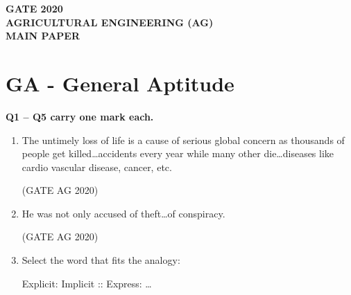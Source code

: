 \documentclass[journal]{IEEEtran}
\begin{document}


\begin{center}
    \textbf{\Large GATE 2020\\
    AGRICULTURAL ENGINEERING (AG)\\
    MAIN PAPER}
\end{center}

\section*{GA - General Aptitude}

\textbf{Q1 -- Q5 carry one mark each.}

\begin{enumerate}
\item 
The untimely loss of life is a cause of serious global concern as thousands of people get killed\dots accidents every year while many other die\dots diseases like cardio vascular disease, cancer, etc.

\begin{enumerate}
\end{enumerate}
\hfill(GATE AG 2020)\\

\medskip

\item 
He was not only accused of theft\dots of conspiracy.

\begin{enumerate}
\end{enumerate}
\hfill(GATE AG 2020)\\

\medskip

\item 
Select the word that fits the analogy:

Explicit: Implicit :: Express: \dots


\end{enumerate}
\end{document}
